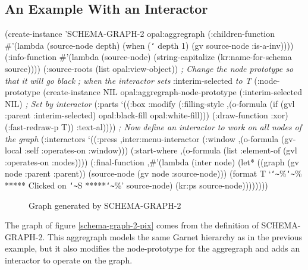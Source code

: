 \begin{group}
\subsection{An Example With an Interactor}
\label{aggregraph-with-interactor}
\vspace{1 line}

\begin{programexample}
(create-instance 'SCHEMA-GRAPH-2 opal:aggregraph
   (:children-function \#'(lambda (source-node depth)
			   (when ({\tt\char`\<} depth 1)
			     (gv source-node :is-a-inv))))
   (:info-function \#'(lambda (source-node)
		       (string-capitalize
			(kr:name-for-schema source))))
   (:source-roots (list opal:view-object))
   {\it ; Change the node prototype so that it will go black}
   {\it ; when the interactor sets} :interim-selected {\it to T}
   (:node-prototype
    (create-instance NIL opal:aggregraph-node-prototype
       (:interim-selected NIL)  {\it ; Set by interactor}
       (:parts
	`((:box :modify
	   (:filling-style ,(o-formula (if (gvl :parent :interim-selected)
					   opal:black-fill
					   opal:white-fill)))
	   (:draw-function :xor) (:fast-redraw-p T))
	  :text-al))))
   {\it ; Now define an interactor to work on all nodes of the graph}
   (:interactors
    `((:press ,inter:menu-interactor
       (:window ,(o-formula (gv-local :self :operates-on :window)))
       (:start-where ,(o-formula (list :element-of
                                       (gvl :operates-on :nodes))))
       (:final-function
	,\#'(lambda (inter node)
	     (let* ((graph (gv node :parent :parent))
		    (source-node (gv node :source-node)))
	       (format T `{\tt\char`\~}\%{\tt\char`\~}\% ***** Clicked on {\tt\char`\~}S *****{\tt\char`\~}\%' source-node)
	       (kr:ps source-node))))))))
\end{programexample}
\end{group}

\begin{figure}
\begin{center}
\end{center}
\caption{Graph generated by SCHEMA-GRAPH-2}
\end{figure}

The graph of figure \ref{schema-graph-2-pix} comes from the definition of
SCHEMA-GRAPH-2.  This aggregraph models the same Garnet hierarchy as in the
previous example, but it also modifies the node-prototype for the
aggregraph and adds an interactor to operate on the graph.

